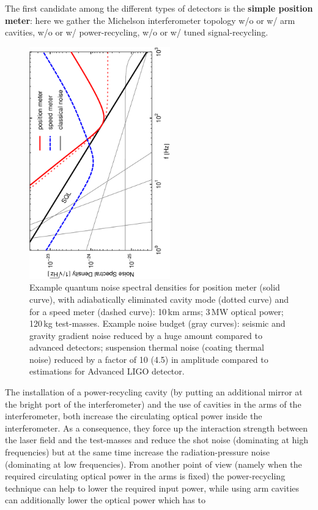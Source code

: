 The first candidate among the different types of detectors is the
{\bf simple position meter}: here we gather the Michelson
interferometer topology w/o or w/ arm cavities, w/o or w/
power-recycling, w/o or w/ tuned
signal-recycling.
%
\begin{figure}[h]
\centerline{\includegraphics[height=10cm,angle=-90]{./Sec_Optics/ETqnoiseNew.pdf}}
\caption{Example quantum noise spectral densities for position
meter (solid curve), with adiabatically eliminated cavity mode
(dotted curve) and for a speed meter (dashed curve): 10\,km arms;
3\,MW optical power; 120\,kg test-masses. Example noise budget
(gray curves): seismic and gravity gradient noise reduced by a
huge amount compared to advanced detectors; suspension thermal
noise (coating thermal noise) reduced by a factor of 10 (4.5) in
amplitude compared to estimations for Advanced LIGO detector.}
\label{Fig:Michqnoise}
\end{figure}
%
The installation of a power-recycling cavity (by putting an
additional mirror at the bright port of the interferometer) and
the use of cavities in the arms of the interferometer, both
increase the circulating optical power inside the interferometer.
As a consequence, they force up the interaction strength between the laser
field and the test-masses and reduce the shot noise (dominating at
high frequencies) but at the same time increase the
radiation-pressure noise (dominating at low frequencies). From
another point of view (namely when the required circulating
optical power in the arms is fixed) the power-recycling technique
can help to lower the required input power, while using arm
cavities can additionally lower the optical power which has to
